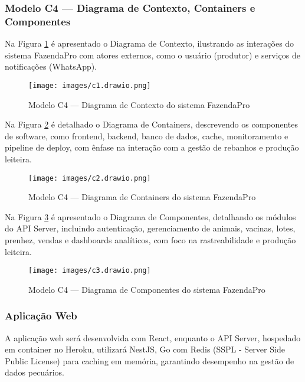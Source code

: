 \documentclass[12pt, a4paper]{article}
\begin{document}
\subsubsection{Modelo C4 — Diagrama de Contexto, Containers e Componentes}
\begin{spacing}{1.5}
Na Figura \ref{fig:C4-Contexto} é apresentado o Diagrama de Contexto, ilustrando as interações do sistema FazendaPro com atores externos, como o usuário (produtor) e serviços de notificações (WhatsApp).

\begin{figure}[H]
    \centering
    \texttt{[image: images/c1.drawio.png]}
    \caption{Modelo C4 — Diagrama de Contexto do sistema FazendaPro}
    \label{fig:C4-Contexto}
\end{figure}

\vspace{0.5cm}

Na Figura \ref{fig:C4-Containers} é detalhado o Diagrama de Containers, descrevendo os componentes de software, como frontend, backend, banco de dados, cache, monitoramento e pipeline de deploy, com ênfase na interação com a gestão de rebanhos e produção leiteira.

\begin{figure}[H]
    \centering
    \texttt{[image: images/c2.drawio.png]}
    \caption{Modelo C4 — Diagrama de Containers do sistema FazendaPro}
    \label{fig:C4-Containers}
\end{figure}

\vspace{0.5cm}

Na Figura \ref{fig:C4-Componentes} é apresentado o Diagrama de Componentes, detalhando os módulos do API Server, incluindo autenticação, gerenciamento de animais, vacinas, lotes, prenhez, vendas e dashboards analíticos, com foco na rastreabilidade e produção leiteira.

\begin{figure}[H]
    \centering
    \texttt{[image: images/c3.drawio.png]}
    \caption{Modelo C4 — Diagrama de Componentes do sistema FazendaPro}
    \label{fig:C4-Componentes}
\end{figure}
\end{spacing}

\subsubsection{Aplicação Web}
\begin{spacing}{1.5}
A aplicação web será desenvolvida com React, enquanto o API Server, hospedado em container no Heroku, utilizará NestJS, Go com Redis (SSPL - Server Side Public License) para caching em memória, garantindo desempenho na gestão de dados pecuários.
\end{spacing}
\end{document}
